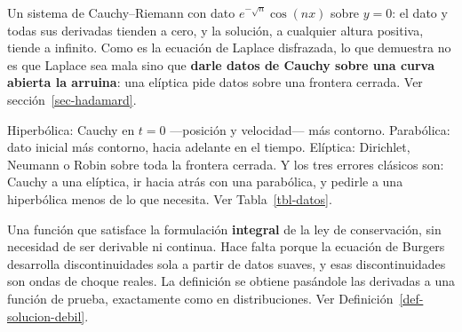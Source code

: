 \documentclass[
  spanish,
  a4paper,
]{scrbook}
\theoremstyle{definition}
\theoremstyle{plain}
\theoremstyle{definition}
\theoremstyle{plain}
\theoremstyle{definition}
\theoremstyle{remark}
\begin{document}
\begin{tcolorbox}[enhanced jigsaw, arc=.35mm, bottomrule=.15mm, bottomtitle=1mm, breakable, colback=white, colbacktitle=quarto-callout-tip-color!10!white, colframe=quarto-callout-tip-color-frame, coltitle=black, left=2mm, leftrule=.75mm, opacityback=0, opacitybacktitle=0.6, rightrule=.15mm, title=\textcolor{quarto-callout-tip-color}{\faLightbulb}\hspace{0.5em}{5. Contá el ejemplo de Hadamard y decí qué demuestra}, titlerule=0mm, toprule=.15mm, toptitle=1mm]

Un sistema de Cauchy--Riemann con dato \(e^{-\sqrt n}\cos(nx)\) sobre
\(y=0\): el dato y todas sus derivadas tienden a cero, y la solución, a
cualquier altura positiva, tiende a infinito. Como es la ecuación de
Laplace disfrazada, lo que demuestra no es que Laplace sea mala sino que
\textbf{darle datos de Cauchy sobre una curva abierta la arruina}: una
elíptica pide datos sobre una frontera cerrada. Ver
sección~\ref{sec-hadamard}.

\end{tcolorbox}

\begin{tcolorbox}[enhanced jigsaw, arc=.35mm, bottomrule=.15mm, bottomtitle=1mm, breakable, colback=white, colbacktitle=quarto-callout-tip-color!10!white, colframe=quarto-callout-tip-color-frame, coltitle=black, left=2mm, leftrule=.75mm, opacityback=0, opacitybacktitle=0.6, rightrule=.15mm, title=\textcolor{quarto-callout-tip-color}{\faLightbulb}\hspace{0.5em}{6. ¿Qué datos pide cada tipo?}, titlerule=0mm, toprule=.15mm, toptitle=1mm]

Hiperbólica: Cauchy en \(t=0\) ---posición y velocidad--- más contorno.
Parabólica: dato inicial más contorno, hacia adelante en el tiempo.
Elíptica: Dirichlet, Neumann o Robin sobre toda la frontera cerrada. Y
los tres errores clásicos son: Cauchy a una elíptica, ir hacia atrás con
una parabólica, y pedirle a una hiperbólica menos de lo que necesita.
Ver Tabla~\ref{tbl-datos}.

\end{tcolorbox}

\begin{tcolorbox}[enhanced jigsaw, arc=.35mm, bottomrule=.15mm, bottomtitle=1mm, breakable, colback=white, colbacktitle=quarto-callout-tip-color!10!white, colframe=quarto-callout-tip-color-frame, coltitle=black, left=2mm, leftrule=.75mm, opacityback=0, opacitybacktitle=0.6, rightrule=.15mm, title=\textcolor{quarto-callout-tip-color}{\faLightbulb}\hspace{0.5em}{7. ¿Qué es una solución débil y por qué hace falta?}, titlerule=0mm, toprule=.15mm, toptitle=1mm]

Una función que satisface la formulación \textbf{integral} de la ley de
conservación, sin necesidad de ser derivable ni continua. Hace falta
porque la ecuación de Burgers desarrolla discontinuidades sola a partir
de datos suaves, y esas discontinuidades son ondas de choque reales. La
definición se obtiene pasándole las derivadas a una función de prueba,
exactamente como en distribuciones. Ver
Definición~\ref{def-solucion-debil}.

\end{tcolorbox}
\end{document}

